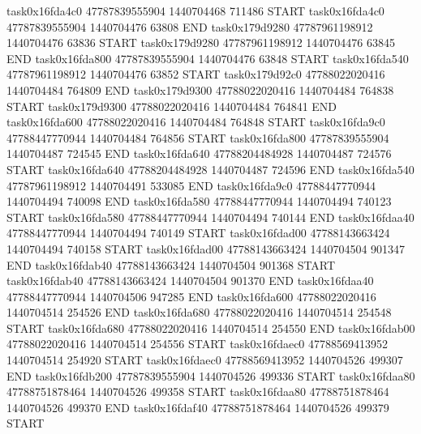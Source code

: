 task0x16fda4c0 47787839555904          1440704468               711486  START
task0x16fda4c0 47787839555904          1440704476                63808  END
task0x179d9280 47787961198912          1440704476                63836  START
task0x179d9280 47787961198912          1440704476                63845  END
task0x16fda800 47787839555904          1440704476                63848  START
task0x16fda540 47787961198912          1440704476                63852  START
task0x179d92c0 47788022020416          1440704484               764809  END
task0x179d9300 47788022020416          1440704484               764838  START
task0x179d9300 47788022020416          1440704484               764841  END
task0x16fda600 47788022020416          1440704484               764848  START
task0x16fda9c0 47788447770944          1440704484               764856  START
task0x16fda800 47787839555904          1440704487               724545  END
task0x16fda640 47788204484928          1440704487               724576  START
task0x16fda640 47788204484928          1440704487               724596  END
task0x16fda540 47787961198912          1440704491               533085  END
task0x16fda9c0 47788447770944          1440704494               740098  END
task0x16fda580 47788447770944          1440704494               740123  START
task0x16fda580 47788447770944          1440704494               740144  END
task0x16fdaa40 47788447770944          1440704494               740149  START
task0x16fdad00 47788143663424          1440704494               740158  START
task0x16fdad00 47788143663424          1440704504               901347  END
task0x16fdab40 47788143663424          1440704504               901368  START
task0x16fdab40 47788143663424          1440704504               901370  END
task0x16fdaa40 47788447770944          1440704506               947285  END
task0x16fda600 47788022020416          1440704514               254526  END
task0x16fda680 47788022020416          1440704514               254548  START
task0x16fda680 47788022020416          1440704514               254550  END
task0x16fdab00 47788022020416          1440704514               254556  START
task0x16fdaec0 47788569413952          1440704514               254920  START
task0x16fdaec0 47788569413952          1440704526               499307  END
task0x16fdb200 47787839555904          1440704526               499336  START
task0x16fdaa80 47788751878464          1440704526               499358  START
task0x16fdaa80 47788751878464          1440704526               499370  END
task0x16fdaf40 47788751878464          1440704526               499379  START

